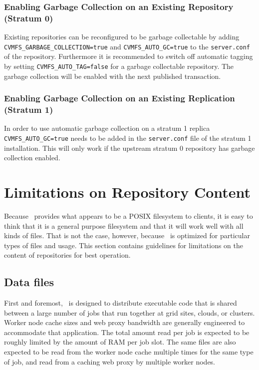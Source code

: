 \subsubsection{Enabling Garbage Collection on an Existing Repository (Stratum 0)}
Existing repositories can be reconfigured to be garbage collectable by adding\\ \texttt{CVMFS\_GARBAGE\_COLLECTION=true} and \texttt{CVMFS\_AUTO\_GC=true} to the \texttt{server.conf} of the repository.
Furthermore it is recommended to switch off automatic tagging by setting \texttt{CVMFS\_AUTO\_TAG=false} for a garbage collectable repository.
The garbage collection will be enabled with the next published transaction.

\subsubsection{Enabling Garbage Collection on an Existing Replication (Stratum 1)}
In order to use automatic garbage collection on a stratum 1 replica \texttt{CVMFS\_AUTO\_GC=true} needs to be added in the \texttt{server.conf} file of the stratum 1 installation.
This will only work if the upstream stratum 0 repository has garbage collection enabled.

\section{Limitations on Repository Content}
Because \cvmfs\ provides what appears to be a POSIX filesystem to clients, it is easy to think that it is a general purpose filesystem and that it will work well with all kinds of files.
That is not the case, however, because \cvmfs\ is optimized for particular types of files and usage.
This section contains guidelines for limitations on the content of repositories for best operation.

\subsection{Data files}
First and foremost, \cvmfs\ is designed to distribute executable code that is shared between a large number of jobs that run together at grid sites, clouds, or clusters.
Worker node cache sizes and web proxy bandwidth are generally engineered to accommodate that application.
The total amount read per job is expected to be roughly limited by the amount of RAM per job slot.
The same files are also expected to be read from the worker node cache multiple times for the same type of job, and read from a caching web proxy by multiple worker nodes.

